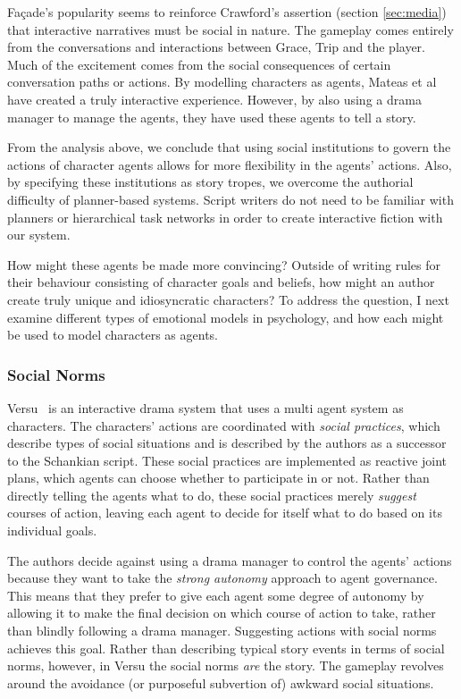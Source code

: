 Fa\c{c}ade's popularity seems to reinforce Crawford's assertion (section \ref{sec:media}) that interactive narratives must be social in nature. The gameplay comes entirely from the conversations and interactions between Grace, Trip and the player. Much of the excitement comes from the social consequences of certain conversation paths or actions. By modelling characters as agents, Mateas et al have created a truly interactive experience. However, by also using a drama manager to manage the agents, they have used these agents to tell a story.

From the analysis above, we conclude that using social institutions to govern the actions of character agents allows for more flexibility in the agents' actions. Also, by specifying these institutions as story tropes, we overcome the authorial difficulty of planner-based systems. Script writers do not need to be familiar with planners or hierarchical task networks in order to create interactive fiction with our system.

How might these agents be made more convincing? Outside of writing rules for their behaviour consisting of character goals and beliefs, how might an author create truly unique and idiosyncratic characters? To address the question, I next examine different types of emotional models in psychology, and how each might be used to model characters as agents.

\subsubsection{Social Norms}
Versu~\cite{evans2014versu} is an interactive drama system that uses a multi agent system as characters. The characters' actions are coordinated with \emph{social practices}, which describe types of social situations and is described by the authors as a successor to the Schankian script. These social practices are implemented as reactive joint plans, which agents can choose whether to participate in or not. Rather than directly telling the agents what to do, these social practices merely \emph{suggest} courses of action, leaving each agent to decide for itself what to do based on its individual goals.

The authors decide against using a drama manager to control the agents' actions because they want to take the \emph{strong autonomy} approach to agent governance. This means that they prefer to give each agent some degree of autonomy by allowing it to make the final decision on which course of action to take, rather than blindly following a drama manager. Suggesting actions with social norms achieves this goal. Rather than describing typical story events in terms of social norms, however, in Versu the social norms \emph{are} the story. The gameplay revolves around the avoidance (or purposeful subvertion of) awkward social situations.


